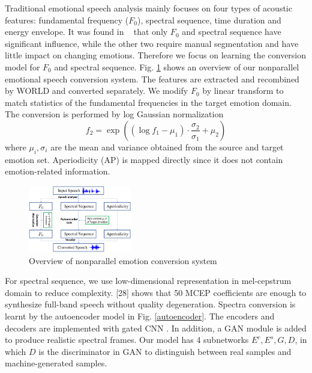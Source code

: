 \documentclass{article}
\begin{document}
Traditional emotional speech analysis mainly focuses on four types of acoustic features: fundamental frequency ($F_0$), spectral sequence, time duration and energy envelope. It was found in ~\cite{xue2018voice} that only $F_0$ and spectral sequence have significant influence, while the other two require manual segmentation and have little impact on changing emotions. Therefore we focus on learning the conversion model for $F_0$ and spectral sequence. Fig. \ref{model} shows an overview of our nonparallel emotional speech conversion system. The features are extracted and recombined by WORLD \cite{morise2016world} and converted separately. We modify $F_0$ by linear transform to match statistics of the fundamental frequencies in the target emotion domain. The conversion is performed by log Gaussian normalization
\begin{equation}
f_2 = \exp((\log f_1 - \mu_1)\cdot\frac{\sigma_2}{\sigma_1} + \mu_2)
\label{eq:f0}
\end{equation}
where $\mu_i, \sigma_i$ are the mean and variance obtained from the source and target emotion set. Aperiodicity (AP) is mapped directly since it does not contain emotion-related information.

\begin{figure}[htb]
\center
\includegraphics[width=0.4\textwidth]{FIG/model}
\caption{Overview of nonparallel emotion conversion system}
\label{model}
\end{figure}

For spectral sequence, we use low-dimensional representation in mel-cepstrum domain to reduce complexity. [28] shows that 50 MCEP coefficients are enough to synthesize full-band speech without quality degeneration. Spectra conversion is learnt by the autoencoder model in Fig. \ref{autoencoder}. The encoders and decoders are implemented with gated CNN \cite{dauphin2017language}. In addition, a GAN module is added to produce realistic spectral frames. Our model has 4 subnetworks $E^c, E^s, G, D$, in which $D$ is the discriminator in GAN to distinguish between real samples and machine-generated samples.
\end{document}

